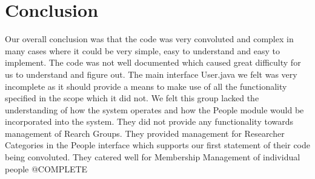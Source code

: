 \documentclass{article}
\begin{document}
\section{Conclusion}
Our overall conclusion was that the code was very convoluted and complex in many cases where it could be very simple, easy to understand and easy to implement. The code was not well documented which caused great difficulty for us to understand and figure out. The main interface User.java we felt was very incomplete as it should provide a means to make use of all the functionality specified in the scope which it did not. We felt this group lacked the understanding of how the system operates and how the People module would be incorporated into the system. They did not provide any functionality towards management of Rearch Groups. They provided management for Researcher Categories in the People interface which supports our first statement of their code being convoluted. They catered well for Membership Management of individual people
@COMPLETE
\end{document}
